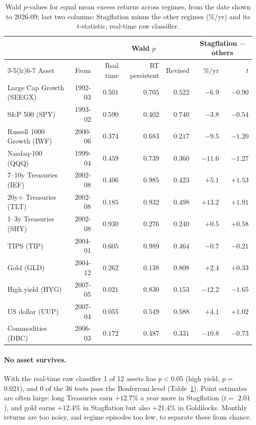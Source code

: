 \documentclass[11pt,a4paper]{article}
\begin{document}
\begin{table}[htbp]
\centering
\caption{Wald $p$-values for equal mean excess returns across regimes, from the date shown to 2026-09; last two
columns: Stagflation minus the other regimes (\%/yr) and its $t$-statistic, real-time raw classifier.}
\label{tab:wald}
\footnotesize
\setlength{\tabcolsep}{4pt}
\begin{tabular}{@{}lrrrrrr@{}}
\toprule
& & \multicolumn{3}{c}{Wald $p$} & \multicolumn{2}{c}{Stagflation $-$ others} \\
\cmidrule(lr){3-5}\cmidrule(lr){6-7}
Asset & From & Real time & RT persistent & Revised & \%/yr & $t$ \\
\midrule
Large Cap Growth (SEEGX) & 1992-03 & $0.501$ & $0.705$ & $0.522$ & $-6.9$ & $-0.90$ \\
S\&P 500 (SPY) & 1993-02 & $0.590$ & $0.402$ & $0.740$ & $-3.8$ & $-0.54$ \\
Russell 1000 Growth (IWF) & 2000-06 & $0.374$ & $0.683$ & $0.217$ & $-9.5$ & $-1.20$ \\
Nasdaq-100 (QQQ) & 1999-04 & $0.459$ & $0.739$ & $0.360$ & $-11.6$ & $-1.27$ \\
7--10y Treasuries (IEF) & 2002-08 & $0.406$ & $0.985$ & $0.423$ & $+5.1$ & $+1.53$ \\
20y+ Treasuries (TLT) & 2002-08 & $0.185$ & $0.932$ & $0.498$ & $+13.2$ & $+1.91$ \\
1--3y Treasuries (SHY) & 2002-08 & $0.930$ & $0.276$ & $0.240$ & $+0.5$ & $+0.58$ \\
TIPS (TIP) & 2004-01 & $0.605$ & $0.989$ & $0.464$ & $-0.7$ & $-0.21$ \\
Gold (GLD) & 2004-12 & $0.262$ & $0.138$ & $0.808$ & $+2.4$ & $+0.33$ \\
High yield (HYG) & 2007-05 & $0.021$ & $0.830$ & $0.153$ & $-12.2$ & $-1.65$ \\
US dollar (UUP) & 2007-04 & $0.055$ & $0.549$ & $0.588$ & $+4.1$ & $+1.02$ \\
Commodities (DBC) & 2006-03 & $0.172$ & $0.487$ & $0.331$ & $-10.8$ & $-0.73$ \\
\bottomrule
\end{tabular}
\end{table}

\paragraph{No asset survives.} With the real-time raw classifier 1 of 12 assets has $p<0.05$
(high yield, $p=$ $0.021$), and 0 of the 36 tests pass the Bonferroni level
(Table~\ref{tab:wald}). Point estimates are often large: long Treasuries earn $+12.7\%$ a year more in
Stagflation ($t=$ $2.01$), and gold earns $+12.4\%$ in Stagflation but also $+21.4\%$ in
Goldilocks. Monthly returns are too noisy, and regime episodes too few, to separate these from chance.
\end{document}
